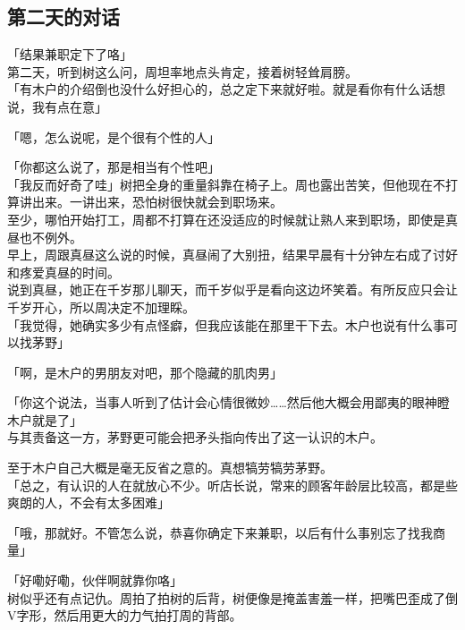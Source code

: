 \subsection{第二天的对话}

「结果兼职定下了咯」\\

第二天，听到树这么问，周坦率地点头肯定，接着树轻耸肩膀。\\

「有木户的介绍倒也没什么好担心的，总之定下来就好啦。就是看你有什么话想说，我有点在意」

「嗯，怎么说呢，是个很有个性的人」

「你都这么说了，那是相当有个性吧」\\

「我反而好奇了哇」树把全身的重量斜靠在椅子上。周也露出苦笑，但他现在不打算讲出来。一讲出来，恐怕树很快就会到职场来。\\

至少，哪怕开始打工，周都不打算在还没适应的时候就让熟人来到职场，即使是真昼也不例外。\\

早上，周跟真昼这么说的时候，真昼闹了大别扭，结果早晨有十分钟左右成了讨好和疼爱真昼的时间。\\

说到真昼，她正在千岁那儿聊天，而千岁似乎是看向这边坏笑着。有所反应只会让千岁开心，所以周决定不加理睬。\\

「我觉得，她确实多少有点怪癖，但我应该能在那里干下去。木户也说有什么事可以找茅野」

「啊，是木户的男朋友对吧，那个隐藏的肌肉男」

「你这个说法，当事人听到了估计会心情很微妙……然后他大概会用鄙夷的眼神瞪木户就是了」\\

与其责备这一方，茅野更可能会把矛头指向传出了这一认识的木户。

至于木户自己大概是毫无反省之意的。真想犒劳犒劳茅野。\\

「总之，有认识的人在就放心不少。听店长说，常来的顾客年龄层比较高，都是些爽朗的人，不会有太多困难」

「哦，那就好。不管怎么说，恭喜你确定下来兼职，以后有什么事别忘了找我商量」

「好嘞好嘞，伙伴啊就靠你咯」\\

树似乎还有点记仇。周拍了拍树的后背，树便像是掩盖害羞一样，把嘴巴歪成了倒V字形，然后用更大的力气拍打周的背部。

